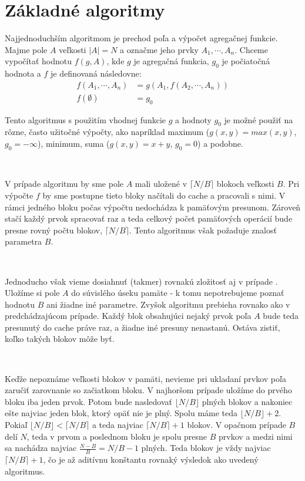 \section{Základné algoritmy}

Najjednoduchším \obliv algoritmom je prechod poľa a výpočet agregačnej funkcie. Majme pole $A$ veľkosti $|A| = N$ a označme jeho prvky $A_1,\cdots,A_n$. Chceme vypočítať hodnotu $f(g, A)$, kde $g$ je agregačná funkcia, $g_0$ je počiatočná hodnota a $f$ je definovaná následovne:
\[
\begin{aligned}
f(A_1,\cdots,A_n) &= g(A_1, f(A_2,\cdots,A_n)) \\
f(\emptyset) &= g_0
\end{aligned}
\]

Tento algoritmus s použitím vhodnej funkcie $g$ a hodnoty $g_0$ je možné použiť na rôzne, často užitočné výpočty, ako napríklad maximum ($g(x, y) = max(x, y)$, $g_0 = -\infty$), minimum, suma ($g(x,y) = x+y$, $g_0 = 0$) a podobne.

\

V prípade \aware algoritmu by sme pole $A$ mali uložené v $\lceil N/B \rceil$ blokoch veľkosti $B$. Pri výpočte $f$ by sme postupne tieto bloky načítali do cache a pracovali s nimi. V rámci jedného bloku počas výpočtu nedochádza k pamäťovým presunom. Zároveň stačí každý prvok spracovať raz a teda celkový počet pamäťových operácií bude presne rovný počtu blokov, $\lceil N/B \rceil$. Tento algoritmus však požaduje znalosť parametra $B$.

\

Jednoducho však vieme dosiahnuť (takmer) rovnakú zložitosť aj v prípade \obliv. Uložíme si pole $A$ do súvislého úseku pamäte - k tomu nepotrebujeme poznať hodnotu $B$ ani žiadne iné parametre. Zvyšok algoritmu prebieha rovnako ako v predchádzajúcom prípade. Každý blok obsahujúci nejaký prvok poľa $A$ bude teda presunutý do cache práve raz, a žiadne iné presuny nenastanú. Ostáva zistiť, koľko takých blokov môže byť.

\

Keďže nepoznáme veľkosti blokov v pamäti, nevieme pri ukladaní prvkov poľa zaručiť zarovnanie so začiatkom bloku. V najhoršom prípade uložíme do prvého bloku iba jeden prvok. Potom bude nasledovať $\lfloor N/B \rfloor$ plných blokov a nakoniec ešte najviac jeden blok, ktorý opäť nie je plný. Spolu máme teda $\lfloor N/B \rfloor + 2$. Pokiaľ $\lfloor N/B \rfloor < \lceil N/B \rceil$ a teda najviac $\lceil N/B \rceil + 1$ blokov. V opačnom prípade $B$ delí $N$, teda v prvom a poslednom bloku je spolu presne $B$ prvkov a medzi nimi sa nachádza najviac $\frac{N-B}{B} = N/B - 1$ plných. Teda blokov je vždy najviac $\lceil N/B \rceil +1$, čo je až aditívnu konštantu rovnaký výsledok ako uvedený \aware algoritmus.

